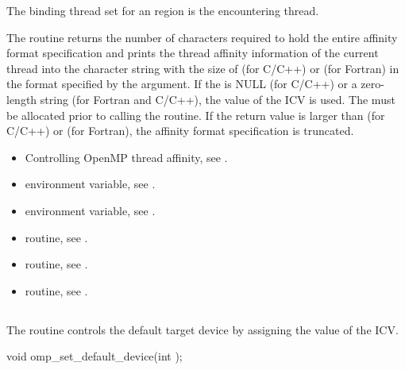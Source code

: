 \binding
The binding thread set for an  region is the encountering thread.

\effect
The  routine returns the number of characters required to hold
the entire affinity format specification and prints the thread affinity information of the current thread
into the character string  with the size of
 (for C/C++) or  (for Fortran) 
in the format specified by the  argument.
If the  is NULL (for C/C++)
or a zero-length string (for Fortran and C/C++), the value of the  ICV is used.
The  must be allocated prior to calling the routine.
If the return value is larger than  (for C/C++) or  (for Fortran), the 
affinity format specification is truncated.

\crossreferences
\begin{itemize}
\item Controlling OpenMP thread affinity, see 
. 
\item {} environment variable, see 
.
\item {} environment variable, see 
.
\item {} routine, see .
\item {} routine, see .
\item {} routine, see .
\end{itemize}





\subsection{}
\label{subsec:omp_set_default_device}

\summary

The  routine controls the default target device by 
assigning the value of the  ICV.

\format
\begin{ccppspecific}
\begin{boxedcode}
void omp\_set\_default\_device(int );
\end{boxedcode}
\end{ccppspecific}

